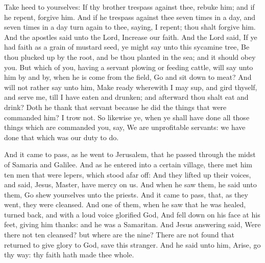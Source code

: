  Take heed to yourselves: If thy brother trespass against
thee, rebuke him; and if he repent, forgive him.  And if he
trespass against thee seven times in a day, and seven times in a day
turn again to thee, saying, I repent; thou shalt forgive him.
 And the apostles said unto the Lord, Increase our faith.
 And the Lord said, If ye had faith as a grain of mustard
seed, ye might say unto this sycamine tree, Be thou plucked up by the
root, and be thou planted in the sea; and it should obey you.
 But which of you, having a servant plowing or feeding
cattle, will say unto him by and by, when he is come from the field, Go
and sit down to meat?  And will not rather say unto him,
Make ready wherewith I may sup, and gird thyself, and serve me, till I
have eaten and drunken; and afterward thou shalt eat and drink?
 Doth he thank that servant because he did the things that
were commanded him? I trow not.  So likewise ye, when ye
shall have done all those things which are commanded you, say, We are
unprofitable servants: we have done that which was our duty to do.

 And it came to pass, as he went to Jerusalem, that he
passed through the midst of Samaria and Galilee.  And as he
entered into a certain village, there met him ten men that were lepers,
which stood afar off:  And they lifted up their voices, and
said, Jesus, Master, have mercy on us.  And when he saw
them, he said unto them, Go shew yourselves unto the priests. And it
came to pass, that, as they went, they were cleansed.  And
one of them, when he saw that he was healed, turned back, and with a
loud voice glorified God,  And fell down on his face at his
feet, giving him thanks: and he was a Samaritan.  And Jesus
answering said, Were there not ten cleansed? but where are the nine?
 There are not found that returned to give glory to God,
save this stranger.  And he said unto him, Arise, go thy
way: thy faith hath made thee whole.

